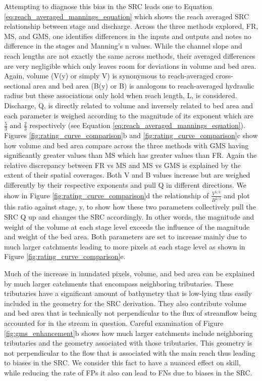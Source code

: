 Attempting to diagnose this bias in the SRC leads one to Equation \ref{eq:reach_averaged_mannings_equation} which shows the reach averaged SRC relationship between stage and discharge.
Across the three methods explored, FR, MS, and GMS, one identifies differences in the inputs and outputs and notes no difference in the stages and Manning's n values.
While the channel slope and reach lengths are not exactly the same across methods, their averaged differences are very negligible which only leaves room for deviations in volume and bed area.
Again, volume (V(y) or simply V) is synonymous to reach-averaged cross-sectional area and bed area (B(y) or B) is analogous to reach-averaged hydraulic radius but these associations only hold when reach length, L, is considered.
Discharge, Q, is directly related to volume and inversely related to bed area and each parameter is weighed according to the magnitude of its exponent which are $\frac{5}{3}$ and $\frac{2}{3}$ respectively (see Equation \ref{eq:reach_averaged_mannings_equation}). 
Figures \ref{fig:rating_curve_comparison}b and \ref{fig:rating_curve_comparison}c show how volume and bed area compare across the three methods with GMS having significantly greater values than MS which has greater values than FR.
Again the relative discrepancy between FR vs MS and MS vs GMS is explained by the extent of their spatial coverages.
Both V and B values increase but are weighed differently by their respective exponents and pull Q in different directions.
We show in Figure \ref{fig:rating_curve_comparison}d the relationship of $\frac{V^{5/3}}{B^{2/3}}$ and plot this ratio against stage, y, to show how these two parameters collectively pull the SRC Q up and changes the SRC accordingly.
In other words, the magnitude and weight of the volume at each stage level exceeds the influence of the magnitude and weight of the bed area.
Both parameters are set to increase mainly due to much larger catchments leading to more pixels at each stage level as shown in Figure \ref{fig:rating_curve_comparison}e.

Much of the increase in inundated pixels, volume, and bed area can be explained by much larger catchments that encompass neighboring tributaries.
These tributaries have a significant amount of bathymetry that is low-lying thus easily included in the geometry for the SRC derivation. 
They also contribute volume and bed area that is technically not perpendicular to the flux of streamflow being accounted for in the stream in question. 
Careful examination of Figure \ref{fig:gms_enhancement}b shows how much larger catchments include neighboring tributaries and the geometry associated with those tributaries. 
This geometry is not perpendicular to the flow that is associated with the main reach thus leading to biases in the SRC.
We consider this fact to have a nuanced effect on skill, while reducing the rate of FPs it also can lead to FNs due to biases in the SRC.

